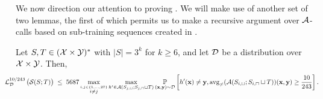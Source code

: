 We now direction our attention to proving . We will make use of another set of two lemmas, the first of which permits us to make a recursive argument over $ \mathcal{A} $-calls based on sub-training sequences created in .

\begin{lemma}\label{lem:recursivelemma}
Let $ S, T\in (\mathcal{X}\times \mathcal{Y})^{*} $ with $ |S|=3^{k}$ for $ k\geq 6$, and let $\mathcal{D}$ be a distribution over $\mathcal{X} \times \mathcal{Y}$. Then, 
\begin{align*}
\hspace{-0.6 cm}
\ls_{\cD}^{10/243}\big(\cS(S;T)\big) \; \leq \; 5687 \max_{\stackrel{i,j\in \{1,\ldots,27  \}}{i\not=j} }\max_{h'\in \erm(S_{j,\sqcup};S_{j,\sqcap}\sqcup T)}\p_{(\rx,\ry)\sim\cD}\left[h'(\rx)\not=\ry,\avg(\erm(S_{i,\sqcup}; S_{i,\sqcap}\sqcup T))(\rx,\ry) \geq \frac{10}{243}\right]. 
\end{align*}
\end{lemma}
